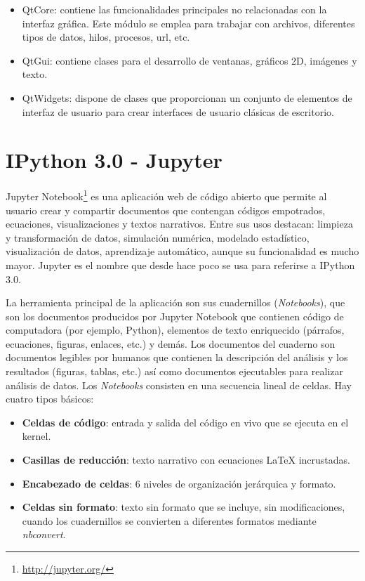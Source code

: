 \begin{itemize}
	\item QtCore: contiene las funcionalidades principales no relacionadas con la interfaz gráfica. Este módulo se emplea para trabajar con archivos, diferentes tipos de datos, hilos, procesos, url, etc.
	\item QtGui: contiene clases para el desarrollo de ventanas, gráficos 2D, imágenes y texto.
	\item QtWidgets: dispone de clases que proporcionan un conjunto de elementos de interfaz de usuario para crear interfaces de usuario clásicas de escritorio. 
\end{itemize}

\section{IPython 3.0 - Jupyter}
Jupyter Notebook\footnote{\url{http://jupyter.org/}} es una aplicación web de código abierto que permite al usuario crear y compartir documentos que contengan códigos empotrados, ecuaciones, visualizaciones y textos narrativos. Entre sus usos destacan: limpieza y transformación de datos, simulación numérica, modelado estadístico, visualización de datos, aprendizaje automático, aunque su funcionalidad es mucho mayor. Jupyter es el nombre que desde hace poco se usa para referirse a IPython 3.0.

La herramienta principal de la aplicación son sus cuadernillos (\textit{Notebooks}), que son los documentos producidos por Jupyter Notebook que contienen código de computadora (por ejemplo, Python), elementos de texto enriquecido (párrafos, ecuaciones, figuras, enlaces, etc.) y demás. Los documentos del cuaderno son documentos legibles por humanos que contienen la descripción del análisis y los resultados (figuras, tablas, etc.) así como documentos ejecutables para realizar análisis de datos.
Los \textit{Notebooks} consisten en una secuencia lineal de celdas. Hay cuatro tipos básicos:

\begin{itemize}
	\item \textbf{Celdas de código}: entrada y salida del código en vivo que se ejecuta en el kernel. 
	\item \textbf{Casillas de reducción}: texto narrativo con ecuaciones LaTeX incrustadas.
	\item \textbf{Encabezado de celdas}: 6 niveles de organización jerárquica y formato.
	\item \textbf{Celdas sin formato}: texto sin formato que se incluye, sin modificaciones, cuando los cuadernillos se convierten a diferentes formatos mediante \textit{nbconvert}.
\end{itemize}

